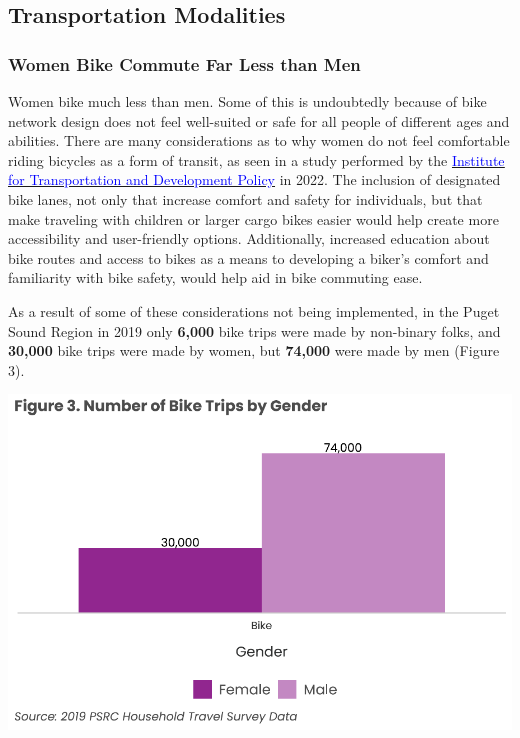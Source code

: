 \documentclass[
  12pt,
]{article}
\begin{document}
\hypertarget{transportation-modalities}{%
\subsection{Transportation Modalities}\label{transportation-modalities}}

\hypertarget{women-bike-commute-far-less-than-men}{%
\subsubsection{Women Bike Commute Far Less than
Men}\label{women-bike-commute-far-less-than-men}}

\begin{flushleft}
Women bike much less than men. Some of this is undoubtedly because of bike network design does not feel well-suited or safe for all people of different ages and abilities. There are many considerations as to why women do not feel comfortable riding bicycles as a form of transit, as seen in a study performed by the \href{https://www.itdp.org/2022/07/06/cyclings-gender-gap/}{\underline{\textcolor{blue}{Institute for Transportation and Development Policy}}} in 2022. The inclusion of designated bike lanes, not only that increase comfort and safety for individuals, but that make traveling with children or larger cargo bikes easier would help create more accessibility and user-friendly options. Additionally, increased education about bike routes and access to bikes as a means to developing a biker's comfort and familiarity with bike safety, would help aid in bike commuting ease. 

As a result of some of these considerations not being implemented, in the Puget Sound Region in 2019 only \textbf{6,000} bike trips were made by non-binary folks, and \textbf{30,000} bike trips were made by women, but \textbf{74,000} were made by men (Figure 3). 
\end{flushleft}

\includegraphics{womens_history_story_draft_files/figure-latex/Bike trips-1.pdf}
\end{document}
